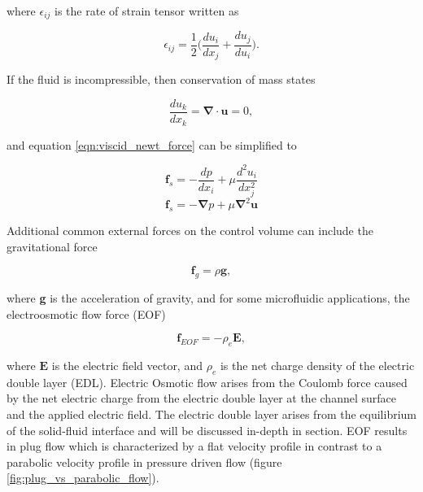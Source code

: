 \noindent where $\epsilon_{ij}$ is the rate of strain tensor written as 

\begin{equation}
    \epsilon_{ij} = \frac{1}{2} \Big(\frac{du_i}{dx_j} + \frac{du_j}{du_i}\Big).
\end{equation}

\noindent If the fluid is incompressible, then conservation of mass states

\begin{equation}
    \frac{du_k}{dx_k} = \boldsymbol{\nabla} \cdot \textbf{u} = 0,
    \label{eqn:incompressible_cons_mass}
\end{equation}

\noindent and equation \ref{eqn:viscid_newt_force} can be simplified to 

\begin{equation}
    \textbf{f}_s = -\frac{dp}{dx_i} + \mu \frac{d^2u_i}{dx^2_j}
\end{equation}
\begin{equation}
    \textbf{f}_s = -\boldsymbol{\nabla}p + \mu\boldsymbol{\nabla}^2\textbf{u}
    \label{eqn:viscous_pressure_force}
\end{equation}

\par Additional common external forces on the control volume can include the gravitational force

\begin{equation}
    \textbf{f}_g = \rho \textbf{g},
    \label{eqn:gravity_force}
\end{equation}

\noindent where \textbf{g} is the acceleration of gravity, and for some microfluidic applications, the electroosmotic flow force (EOF)

\begin{equation}
    \textbf{f}_{EOF} = -\rho_e \boldsymbol{E},
\end{equation}

\noindent where $\boldsymbol{E}$ is the electric field vector, and $\rho_e$ is the net charge density of the electric double layer (EDL). Electric Osmotic flow arises from the Coulomb force caused by the net electric charge from the electric double layer at the channel surface and the applied electric field. The electric double layer arises from the equilibrium of the solid-fluid interface and will be discussed in-depth in section. EOF results in plug flow which is characterized by a flat velocity profile in contrast to a parabolic velocity profile in pressure driven flow (figure \ref{fig:plug_vs_parabolic_flow}).

